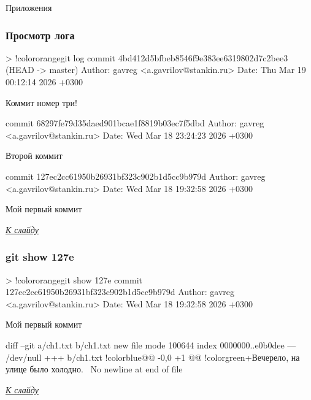 \documentclass[9pt, aspectratio=1610]{beamer}
\begin{document}
\begin{frame}
	\centering\Huge Приложения
\end{frame}

\begin{frame}[fragile=singleslide]\frametitle{Просмотр лога}\label{f:log}
	
		\begin{VerbatimCmd}[gobble=2,fontsize=\small]
		
		
		> !color{orange}git log
		commit 4bd412d5bfbeb8546f9e383ee6319802d7c2bee3 (HEAD -> master)
		Author: gavreg <a.gavrilov@stankin.ru>
		Date:   Thu Mar 19 00:12:14 2026 +0300
		
		Коммит номер три!
		
		commit 68297fe79d35daed901bcae1f8819b03ec7f5dbd
		Author: gavreg <a.gavrilov@stankin.ru>
		Date:   Wed Mar 18 23:24:23 2026 +0300
		
		Второй коммит
		
		commit 127ec2cc61950b26931bf323c902b1d5cc9b979d
		Author: gavreg <a.gavrilov@stankin.ru>
		Date:   Wed Mar 18 19:32:58 2026 +0300
		
		Мой первый коммит
		
	\end{VerbatimCmd}
	
	\hyperlink{ref:tolog}{\color{cyan}\itshape К слайду}
	
\end{frame}

\begin{frame}[fragile=singleslide]\frametitle{git show 127e}\label{f:show1}
	
	\begin{VerbatimCmd}[gobble=2]
		
		> !color{orange}git show 127e   
		commit 127ec2cc61950b26931bf323c902b1d5cc9b979d
		Author: gavreg <a.gavrilov@stankin.ru>
		Date:   Wed Mar 18 19:32:58 2026 +0300
		
		Мой первый коммит
		
		diff --git a/ch1.txt b/ch1.txt
		new file mode 100644
		index 0000000..e0b0dee
		--- /dev/null
		+++ b/ch1.txt
		!color{blue}@@ -0,0 +1 @@
		!color{green}+Вечерело, на улице было холодно.
		\ No newline at end of file
		
	\end{VerbatimCmd}
	
	\hyperlink{f:show_back}{\color{cyan}\itshape К слайду}
	
\end{frame}
\end{document}
